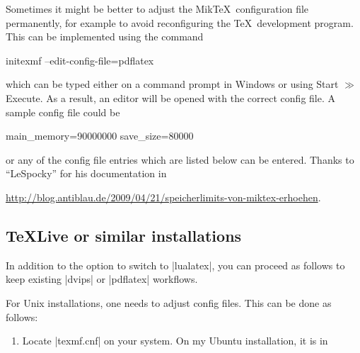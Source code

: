 {Sometimes it might be better to adjust the Mik\TeX\ configuration file permanently, for example to avoid reconfiguring the \TeX\ development program. This can be implemented using the command
\begin{codeexample}
initexmf --edit-config-file=pdflatex
\end{codeexample}
\noindent which can be typed either on a command prompt in Windows or using Start $\gg$ Execute. As a result, an editor will be opened with the correct config file. A sample config file could be
\begin{codeexample}
main_memory=90000000
save_size=80000
\end{codeexample}
or any of the config file entries which are listed below can be entered.
Thanks to ``LeSpocky'' for his documentation in

\url{http://blog.antiblau.de/2009/04/21/speicherlimits-von-miktex-erhoehen}.

\subsection{\TeX Live or similar installations}
In addition to the option to switch to |lualatex|, you can proceed as follows to keep existing |dvips| or |pdflatex| workflows.

For Unix installations, one needs to adjust config files. This can be done as follows:
\begin{enumerate}
	\item Locate |texmf.cnf| on your system. On my Ubuntu installation, it is in
	

\end{enumerate}}
